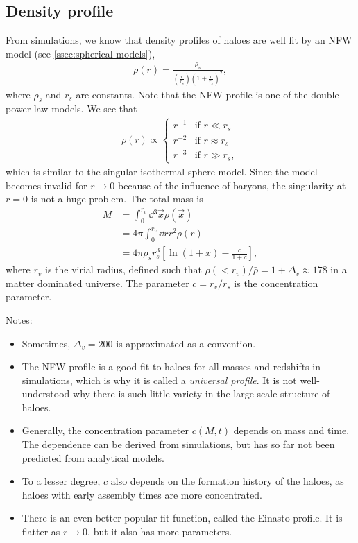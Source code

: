 \subsection{Density profile}
From simulations, we know that density profiles of haloes are well fit by an NFW model (see \cref{ssec:spherical-models}),
\begin{align*}
	\rho(r)
	= \frac{\rho_s}{\left( \frac{r}{r_s} \right) \left( 1 + \frac{r}{r_s} \right)^2},
\end{align*}
where $\rho_s$ and $r_s$ are constants.
Note that the NFW profile is one of the double power law models.
We see that
\begin{align*}
	\rho(r)
	\propto
	\begin{cases}
		r^{-1} & \text{if } r \ll r_s\\
		r^{-2} & \text{if } r \approx r_s\\
		r^{-3} & \text{if } r \gg r_s,
	\end{cases}
\end{align*}
which is similar to the singular isothermal sphere model.
Since the model becomes invalid for $r \to 0$ because of the influence of baryons, the singularity at $r = 0$ is not a huge problem.
The total mass is
\begin{align*}
	M
	&= \int_0^{r_v} \dd{^3\vec{x}} \rho(\vec{x})\\
	&= 4\pi \int_0^{r_v} \dd{r} r^2 \rho(r)\\
	&= 4\pi \rho_s r_s^3 \left[ \ln(1+x) - \frac{c}{1+c} \right],
\end{align*}
where $r_v$ is the virial radius, defined such that $\rho(< r_v)/\bar{\rho} = 1 + \Delta_v \approx 178$ in a matter dominated universe.
The parameter $c = r_v/r_s$ is the concentration parameter.

Notes:
\begin{itemize}
	\item Sometimes, $\Delta_v = 200$ is approximated as a convention.
	\item The NFW profile is a good fit to haloes for all masses and redshifts in simulations, which is why it is called a \emph{universal profile}.
	It is not well-understood why there is such little variety in the large-scale structure of haloes.
	\item Generally, the concentration parameter $c(M, t)$ depends on mass and time.
	The dependence can be derived from simulations, but has so far not been predicted from analytical models.
	\item To a lesser degree, $c$ also depends on the formation history of the haloes, as haloes with early assembly times are more concentrated.
	\item There is an even better popular fit function, called the Einasto profile.
	It is flatter as $r \to 0$, but it also has more parameters.
\end{itemize}




